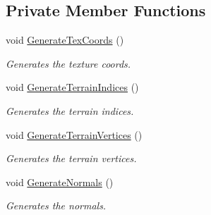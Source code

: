 \subsection*{Private Member Functions}
\begin{DoxyCompactItemize}
\item 
void \hyperlink{class_terrain_a39c46be48d267589430a97b00cd3399d}{Generate\+Tex\+Coords} ()
\begin{DoxyCompactList}\small\item\em Generates the texture coords. \end{DoxyCompactList}\item 
void \hyperlink{class_terrain_a6d4038969c8f9db67de07f03b2ac6b9a}{Generate\+Terrain\+Indices} ()
\begin{DoxyCompactList}\small\item\em Generates the terrain indices. \end{DoxyCompactList}\item 
void \hyperlink{class_terrain_a7b82fc680b5747dadda8477bdcf33cf9}{Generate\+Terrain\+Vertices} ()
\begin{DoxyCompactList}\small\item\em Generates the terrain vertices. \end{DoxyCompactList}\item 
void \hyperlink{class_terrain_a73df20324a97a2dd88807539b9cbc783}{Generate\+Normals} ()
\begin{DoxyCompactList}\small\item\em Generates the normals. \end{DoxyCompactList}\end{DoxyCompactItemize}
